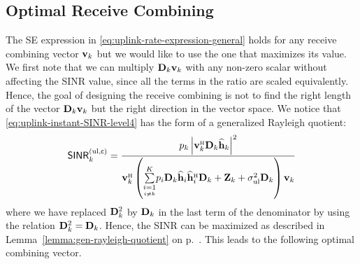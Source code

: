 \subsection{Optimal Receive Combining}
\label{subsec:optimal-receive-combining}
The SE expression in \eqref{eq:uplink-rate-expression-general} holds for any receive combining vector $\mathbf{v}_{k}$ but we would like to use the one that maximizes its value.
We first note that we can multiply $\mathbf{D}_k \mathbf{v}_{k}$ with any non-zero scalar without affecting the SINR value, since all the terms in the ratio are scaled equivalently. Hence, the goal of designing the receive combining  is not to find the right length of the vector $\mathbf{D}_k \mathbf{v}_{k}$ but the right direction in the vector space.
We notice that \eqref{eq:uplink-instant-SINR-level4} has the form of a generalized Rayleigh quotient:
	\begin{equation} \label{eq:uplink-instant-SINR-level4-Rayleigh}
	\mathacr{SINR}_{k}^{({\rm ul},\cent)} = \frac{ p_{k} \left |  \vect{v}_{k}^{\Htran} \vect{D}_{k}\widehat{\vect{h}}_{k} \right|^2  }{\vect{v}_{k}^{\Htran} \left(   \condSum{i=1}{i \neq k}{K} p_{i}  \vect{D}_{k}\widehat{\vect{h}}_{i} \widehat{\vect{h}}_{i}^{\Htran}\vect{D}_{k} + \vect{Z}_{k}  + \sigmaUL \vect{D}_k \right) \vect{v}_{k}  
	}
	\end{equation}
where we have replaced $\mathbf{D}_k^2$ by $\mathbf{D}_k$ in the last term of the denominator by using the relation $\mathbf{D}_k^2=\mathbf{D}_k$. Hence, the SINR can be maximized as described in Lemma~\ref{lemma:gen-rayleigh-quotient} on p.~\pageref{lemma:gen-rayleigh-quotient}. This leads to the following optimal combining vector.

